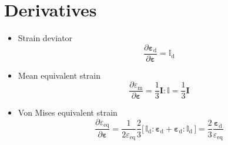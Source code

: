 \documentclass[times,namecite]{goose-article}
\begin{document}
\section{Derivatives}
\label{sec:derivatives}

\begin{itemize}
%
\item Strain deviator
\begin{equation}
  \frac{ \partial \bm{\varepsilon}_\mathrm{d} }{ \partial \bm{\varepsilon} }
  = \mathbb{I}_\mathrm{d}
\end{equation}
%
\item Mean equivalent strain
\begin{equation}
  \frac{ \partial \varepsilon_\mathrm{m} }{ \partial \bm{\varepsilon} }
  =
  \frac{1}{3} \bm{I} : \mathbb{I}
  =
  \frac{1}{3} \bm{I}
\end{equation}
%
\item Von Mises equivalent strain
\begin{equation}
  \frac{ \partial \varepsilon_\mathrm{eq} }{ \partial \bm{\varepsilon} }
  =
  \frac{1}{2 \varepsilon_\mathrm{eq}} \frac{2}{3}
  \big[\, \mathbb{I}_\mathrm{d} : \bm{\varepsilon}_\mathrm{d} + \bm{\varepsilon}_\mathrm{d} : \mathbb{I}_\mathrm{d} \,\big]
  =
  \frac{2}{3} \frac{\bm{\varepsilon}_\mathrm{d}}{\varepsilon_\mathrm{eq}}
\end{equation}
%
\end{itemize}


\end{document}
